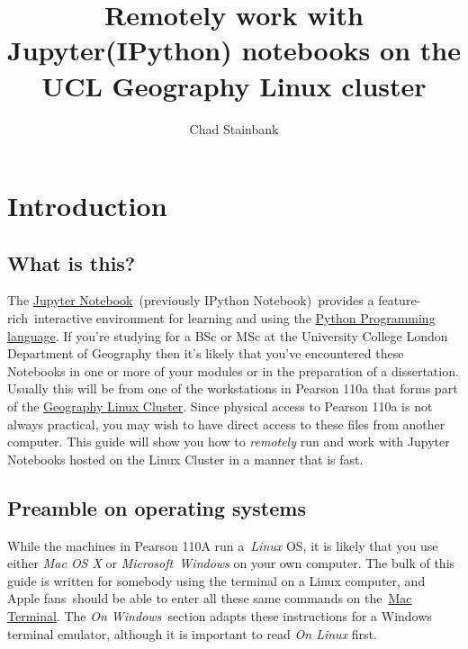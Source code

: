 \documentclass[a4paper]{article}
\title{Remotely work with Jupyter(IPython) notebooks on the UCL Geography Linux cluster}
\author{Chad Stainbank}
\begin{document}
\maketitle
\section{Introduction}
\subsection{What is this?}

The \href{http://jupyter.org/}{Jupyter Notebook}~(previously IPython Notebook)~provides a feature-rich~interactive environment for learning and using the \href{https://www.python.org/}{Python Programming language}.
If you're studying for a BSc or MSc at the University College London Department of Geography then it's likely that you've encountered these Notebooks in one or more of your modules or in the preparation of a dissertation.
Usually this will be from one of the workstations in Pearson 110a that forms part of the \href{http://www.geog.ucl.ac.uk/resources/computer-support/teaching-cluster}{Geography Linux Cluster}.
Since physical access to Pearson 110a is not always practical, you may wish to have direct access to these files from another computer.
This guide will show you how to \emph{remotely} run and work with Jupyter Notebooks hosted on the Linux Cluster in a manner that is fast.

\subsection{Preamble on operating systems}

While the machines in Pearson 110A run a~\emph{Linux} OS, it is likely that you use either \emph{Mac OS X} or \emph{Microsoft~Windows} on your own computer. The bulk of this guide is written for somebody using the terminal on a Linux computer, and Apple fans~should be able to enter all these same commands on the~\href{http://www.macworld.co.uk/feature/mac-software/get-more-out-of-os-x-terminal-3608274/}{Mac Terminal}. The \emph{On Windows~}section adapts these instructions for a Windows terminal emulator, although it is important to read \emph{On Linux} first.
\end{document}
